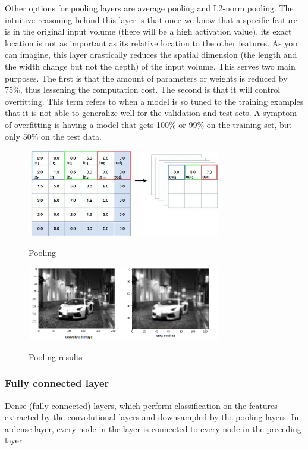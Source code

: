 \documentclass[12pt]{article}
\begin{document}
          Other options for pooling layers are average pooling and L2-norm pooling. The intuitive reasoning behind this layer is that once we know that a specific feature is in the original input volume (there will be a high activation value), its exact location is not as important as its relative location to the other features. As you can imagine, this layer drastically reduces the spatial dimension (the length and the width change but not the depth) of the input volume. This serves two main purposes. The first is that the amount of parameters or weights is reduced by 75\%, thus lessening the computation cost. The second is that it will control overfitting. This term refers to when a model is so tuned to the training examples that it is not able to generalize well for the validation and test sets. A symptom of overfitting is having a model that gets 100\% or 99\% on the training set, but only 50\% on the test data.
         
          \begin{figure}[h]
    	\centering
    	\includegraphics[width=0.75\textwidth]{popo.jpg}
       	\label{fig:mesh14}
	\caption{Pooling}
	\end{figure} 
         
               
        \begin{figure}[h]
    	\centering
    	\includegraphics[width=0.75\textwidth]{pooling.png}
       	\label{fig:mesh15}
	\caption{Pooling results}
	\end{figure} 
	
		
	
        \subsubsection{Fully connected layer }
        Dense (fully connected) layers, which perform classification on the features extracted by the convolutional layers and downsampled by the pooling layers. In a dense layer, every node in the layer is connected to every node in the preceding layer
\end{document}
